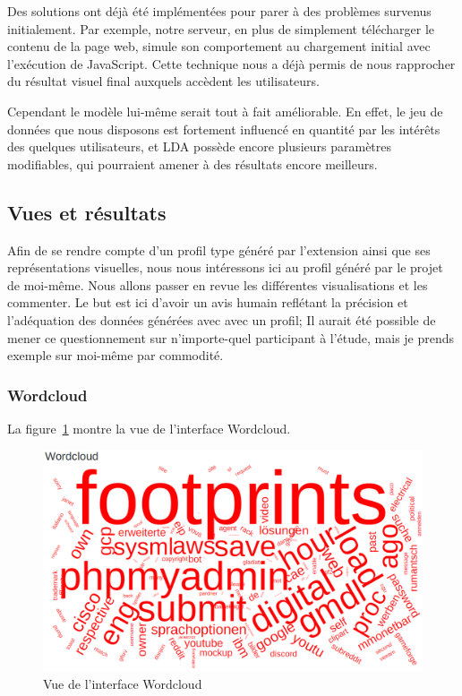 				Des solutions ont déjà été implémentées pour parer à des problèmes survenus initialement. Par exemple, notre serveur, en plus de simplement télécharger le contenu de la page web, simule son comportement au chargement initial avec l'exécution de JavaScript. Cette technique nous a déjà permis de nous rapprocher du résultat visuel final auxquels accèdent les utilisateurs.

			Cependant le modèle lui-même serait tout à fait améliorable. En effet, le jeu de données que nous disposons est fortement influencé en quantité par les intérêts des quelques utilisateurs, et LDA possède encore plusieurs paramètres modifiables, qui pourraient amener à des résultats encore meilleurs.

	\subsection{Vues et résultats}\label{evaluation-vues}

		Afin de se rendre compte d'un profil type généré par l'extension ainsi que ses représentations visuelles, nous nous intéressons ici au profil généré par le projet de moi-même. Nous allons passer en revue les différentes visualisations et les commenter. Le but est ici d'avoir un avis humain reflétant la précision et l'adéquation des données générées avec avec un profil; Il aurait été possible de mener ce questionnement sur n’importe-quel participant à l'étude, mais je prends exemple sur moi-même par commodité.

		\subsubsection{Wordcloud}

		La figure~\ref{critique-wordcloud} montre la vue de l'interface Wordcloud.

		\begin{figure}[!h]
			\centering
			\includegraphics[width=1\textwidth]{images/results/critique-wordcloud}
			\caption{Vue de l'interface Wordcloud}
			\label{critique-wordcloud}
		\end{figure}


